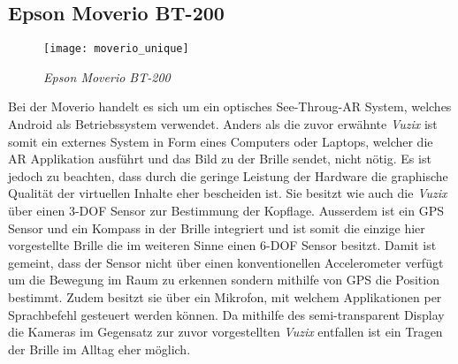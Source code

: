 \subsection*{Epson Moverio BT-200}
\begin{wrapfigure}{l}{0.5\textwidth}
	\vspace{-20pt}
	\begin{center}
		\texttt{[image: moverio\_unique]}
	\end{center}
	\vspace{-15pt}
	\caption{\textit{Epson Moverio BT-200}}\label{moveriogrpahic}
	\vspace{-12pt}
\end{wrapfigure}
Bei der Moverio handelt es sich um ein optisches See-Throug-AR System, welches Android als Betriebssystem verwendet. Anders als die zuvor erwähnte \textit{Vuzix} ist somit ein externes System in Form eines Computers oder Laptops, welcher die AR Applikation ausführt und das Bild zu der Brille sendet, nicht nötig. Es ist jedoch zu beachten, dass durch die geringe Leistung der Hardware die graphische Qualität der virtuellen Inhalte eher bescheiden ist.  Sie besitzt wie auch die \textit{Vuzix} über einen 3-DOF Sensor zur Bestimmung der Kopflage. Ausserdem ist ein GPS Sensor und ein Kompass in der Brille integriert und ist somit die einzige hier vorgestellte Brille die im weiteren Sinne einen 6-DOF Sensor besitzt. Damit ist gemeint, dass der Sensor nicht über einen konventionellen Accelerometer verfügt um die Bewegung im Raum zu erkennen sondern mithilfe von GPS die Position bestimmt. Zudem besitzt sie über ein Mikrofon, mit welchem Applikationen per Sprachbefehl gesteuert werden können. Da mithilfe des semi-transparent Display die Kameras im Gegensatz zur zuvor vorgestellten \textit{Vuzix} entfallen ist ein Tragen der Brille im Alltag eher möglich.\cite{website:epson}
\newpage
